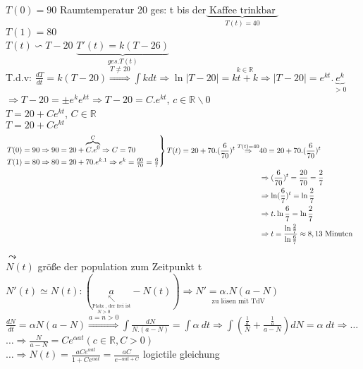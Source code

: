 \begin{example}
$	T(0)=90$     Raumtemperatur 20     ges: t bis der$\underbrace{ \text{ Kaffee trinkbar }}_{T(t)=40}$ \\
$T(1)=80$\\
$T(t) \backsim T-20$   $\underbrace{T'(t)=k(T-26)}_{ges. T(t)}$\\
T.d.v: $\frac{dT}{dt}=k(T-20) \overset{T\neq 20}{\Rightarrow} \int k dt \Rightarrow \ln |T-20|=\overset{k \in \mathbb{R}}{kt+k }\Rightarrow |T-20|=e^{kt}.\underbrace{e^k}_{>0}$\\
$ \Rightarrow T-20= \pm e^k e^{kt}\Rightarrow T-20= C.e^{kt}$, $c\in\mathbb{R} \backslash {0}$\\
$T=20+C e^{kt}$, $C \in \mathbb{R}$\\
$T=20 +C e^{kt}$ \\
\begin{align*}
\begin{rcases*}
T(0)=90 \Rightarrow 90= 20+\overbrace{C.e^0}^{C} \Rightarrow
 C=70\\
 T(1)=80 \Rightarrow 80=20+70.e^{k.1}\Rightarrow e^k=\frac{60}{70} =\frac{6}{7} 
 \end{rcases*}T(t)=20+70 .(\frac{6}{70})^t  \overset{T(t)=40}{\Rightarrow}& 40 =20 +70 .(\frac{6}{70})^t\\
& \Rightarrow (\frac{6}{70})^t =\frac{20}{70}=\frac{2}{7}\\
 &\Rightarrow \ln (\frac{6}{7})^t = \ln \frac{2}{7} \\
 &\Rightarrow t .\ln \frac{6}{7}= \ln\frac{2}{7}\\
&\Rightarrow t=\frac{\ln \frac{2}{7}}{\ln \frac{6}{7}} \approx 8,13 \text{ Minuten}
 \end{align*}
\end{example}
\begin{example}
	 $\leadsto$ \\
	$N(t)$ größe der population zum Zeitpunkt t\\
	$N'(t) \simeq N(t): (\underset{\underset{\text{Platz , der frei ist}}{\nwarrow}}{a}-N(t)) \Rightarrow \underset{\text{ zu lösen mit TdV}}{N'= \alpha .N(a-N)}$\\
	$\frac{dN}{dt}=\alpha N(a-N) \overset{\overset{N>0}{a=n>0}}{\Rightarrow} \int \frac{dN}{N.(a-N)}= \int \alpha \ dt \Rightarrow \int (\frac{\frac{1}{a}}{N}+\frac{\frac{1}{a}}{a-N})dN=\alpha \; dt \Rightarrow \dots $\\
	$\dots \Rightarrow \frac{N}{a-N}=C e^{\alpha a t}(c\in \mathbb{R}, C>0)$\\
	$\dots \Rightarrow N(t)= \frac{aCe^{\alpha a t}}{1+Ce^{\alpha at}}=\frac{aC}{e^{-\alpha a t+C}}$  logictile gleichung
\end{example}